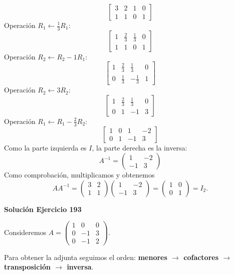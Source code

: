 \documentclass[12pt]{article}
\begin{document}
\[
\left[\begin{array}{rr|rr}3&2&1&0\\1&1&0&1\end{array}\right]
\]
Operación $R_{1}\leftarrow \frac{1}{3}R_{1}$:
\[
\left[\begin{array}{rr|rr}1&\frac{2}{3}&\frac{1}{3}&0\\1&1&0&1\end{array}\right]
\]
Operación $R_{2}\leftarrow R_{2}-1R_{1}$:
\[
\left[\begin{array}{rr|rr}1&\frac{2}{3}&\frac{1}{3}&0\\0&\frac{1}{3}&- \frac{1}{3}&1\end{array}\right]
\]
Operación $R_{2}\leftarrow 3R_{2}$:
\[
\left[\begin{array}{rr|rr}1&\frac{2}{3}&\frac{1}{3}&0\\0&1&-1&3\end{array}\right]
\]
Operación $R_{1}\leftarrow R_{1}-\frac{2}{3}R_{2}$:
\[
\left[\begin{array}{rr|rr}1&0&1&-2\\0&1&-1&3\end{array}\right]
\]
Como la parte izquierda es $I$, la parte derecha es la inversa:
\[
\boxed{A^{-1}=\begin{pmatrix}1&-2\\-1&3\end{pmatrix}}
\]
Como comprobación, multiplicamos y obtenemos
\[
AA^{-1}=\begin{pmatrix}3&2\\1&1\end{pmatrix}\begin{pmatrix}1&-2\\-1&3\end{pmatrix}=\begin{pmatrix}1&0\\0&1\end{pmatrix}=I_{2}.
\]

\par\bigskip\noindent\textbf{Solución Ejercicio 193}\par\nobreak
Consideremos $A=\begin{pmatrix}1&0&0\\0&-1&3\\0&-1&2\end{pmatrix}$.

Para obtener la adjunta seguimos el orden: \textbf{menores $\to$ cofactores $\to$ transposición $\to$ inversa}.
\end{document}
